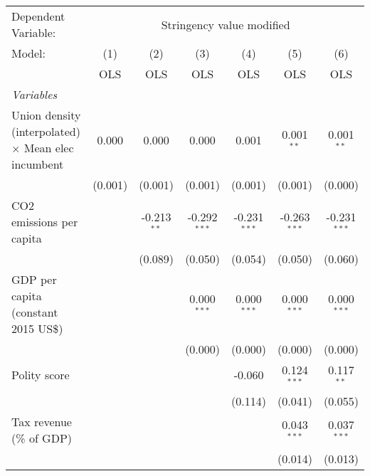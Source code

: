 
\begingroup
\centering
\begin{tabular}{lcccccc}
   \toprule
   Dependent Variable: & \multicolumn{6}{c}{Stringency value modified}\\
   Model:                                                     & (1)     & (2)           & (3)            & (4)            & (5)            & (6)\\  
                                                              &  OLS    & OLS           & OLS            & OLS            & OLS            & OLS\\  
   \midrule
   \emph{Variables}\\
   Union density (interpolated) $\times$ Mean elec incumbent  & 0.000   & 0.000         & 0.000          & 0.001          & 0.001$^{**}$   & 0.001$^{**}$\\   
                                                              & (0.001) & (0.001)       & (0.001)        & (0.001)        & (0.001)        & (0.000)\\   
   CO2 emissions per capita                                   &         & -0.213$^{**}$ & -0.292$^{***}$ & -0.231$^{***}$ & -0.263$^{***}$ & -0.231$^{***}$\\   
                                                              &         & (0.089)       & (0.050)        & (0.054)        & (0.050)        & (0.060)\\   
   GDP per capita (constant 2015 US\$)                        &         &               & 0.000$^{***}$  & 0.000$^{***}$  & 0.000$^{***}$  & 0.000$^{***}$\\   
                                                              &         &               & (0.000)        & (0.000)        & (0.000)        & (0.000)\\   
   Polity score                                               &         &               &                & -0.060         & 0.124$^{***}$  & 0.117$^{**}$\\   
                                                              &         &               &                & (0.114)        & (0.041)        & (0.055)\\   
   Tax revenue (\% of GDP)                                    &         &               &                &                & 0.043$^{***}$  & 0.037$^{***}$\\   
                                                              &         &               &                &                & (0.014)        & (0.013)\\   

\end{tabular}
